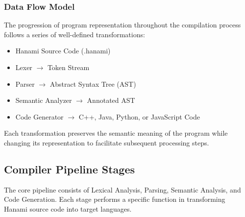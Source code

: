 \documentclass[conference]{IEEEtran}
\begin{document}
\subsubsection{Data Flow Model}

The progression of program representation throughout the compilation process follows a series of well-defined transformations:

\begin{itemize}
    \item Hanami Source Code (.hanami)
    \item Lexer $\rightarrow$ Token Stream
    \item Parser $\rightarrow$ Abstract Syntax Tree (AST)
    \item Semantic Analyzer $\rightarrow$ Annotated AST
    \item Code Generator $\rightarrow$ C++, Java, Python, or JavaScript Code %
\end{itemize}

Each transformation preserves the semantic meaning of the program while changing its representation to facilitate subsequent processing steps.

\subsection{Compiler Pipeline Stages}
\label{subsec:pipeline}

The core pipeline consists of Lexical Analysis, Parsing, Semantic Analysis, and Code Generation. Each stage performs a specific function in transforming Hanami source code into target languages.
\end{document}
